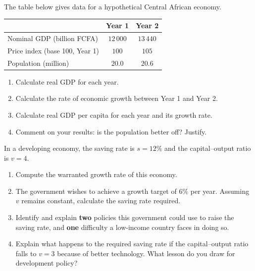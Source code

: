 \documentclass[11pt]{article}
\begin{document}
\begin{exercice}
The table below gives data for a hypothetical Central African economy.
\begin{center}
\begin{tabular}{|l|c|c|}
\hline
\rowcolor{popblueL} & \textbf{Year 1} & \textbf{Year 2} \\ \hline
Nominal GDP (billion FCFA) & $12\,000$ & $13\,440$ \\ \hline
Price index (base 100, Year 1) & $100$ & $105$ \\ \hline
Population (million) & $20.0$ & $20.6$ \\ \hline
\end{tabular}
\end{center}
\begin{enumerate}
\item Calculate real GDP for each year.
\item Calculate the rate of economic growth between Year 1 and Year 2.
\item Calculate real GDP per capita for each year and its growth rate.
\item Comment on your results: is the population better off? Justify.
\end{enumerate}
\end{exercice}

\begin{exercice}
In a developing economy, the saving rate is $s = 12\%$ and the capital--output ratio is $v = 4$.
\begin{enumerate}
\item Compute the warranted growth rate of this economy.
\item The government wishes to achieve a growth target of $6\%$ per year. Assuming $v$ remains constant, calculate the saving rate required.
\item Identify and explain \textbf{two} policies this government could use to raise the saving rate, and \textbf{one} difficulty a low-income country faces in doing so.
\item Explain what happens to the required saving rate if the capital--output ratio falls to $v = 3$ because of better technology. What lesson do you draw for development policy?
\end{enumerate}
\end{exercice}
\end{document}
